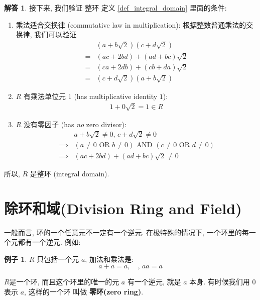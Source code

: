 \documentclass[utf8]{ctexbook}
\theoremstyle{definition}
\newtheorem{example}{例子}[section]
\newtheorem*{soln}{解答}
\begin{document}
\begin{soln}
接下来, 我们验证 整环 定义 \ref{def_integral_domain} 里面的条件:
\begin{enumerate}
\item{乘法适合交换律 (commutative law in multiplication): 根据整数普通乘法的交换律, 我们可以验证
\begin{align*}
& (a + b \sqrt{2}) (c + d \sqrt{2}) \\
=& (ac + 2bd) + (ad + bc) \sqrt{2} \\
=& (ca + 2db) + (cb + da) \sqrt{2} \\
=& (c + d \sqrt{2}) (a + b \sqrt{2})
\end{align*}
}
\item{$R$ 有乘法单位元 $1$ (has multiplicative identity $1$):
\begin{align*}
1 + 0 \sqrt{2} = 1 \in R
\end{align*}
}
\item{$R$ 没有零因子 (has \emph{no} zero divisor):
\begin{align*}
& a + b \sqrt{2} \neq 0, \,  c + d \sqrt{2} \neq 0 \\
\implies & (a \neq 0 \mbox{ OR } b \neq 0) \mbox{ AND } (c \neq 0 \mbox{ OR } d \neq 0) \\
\implies & (ac + 2bd) + (ad + bc) \sqrt{2} \neq 0 
\end{align*}
}
\end{enumerate}

所以, $R$ 是整环 (integral domain).

\end{soln}





\section{除环和域(Division Ring and Field)}

一般而言, 环的一个任意元不一定有一个逆元. 在极特殊的情况下, 一个环里的每一个元都有一个逆元. 例如:

\begin{example}
$R$ 只包括一个元 $a$, 加法和乘法是:
\begin{equation}
a + a = a, \quad, \, a a = a
\end{equation}

$R$是一个环, 而且这个环里的唯一的元 $a$ 有一个逆元, 就是 $a$ 本身. 有时候我们用 $0$ 表示 $a$, 这样的一个环 叫做 \textbf{零环(zero ring)}.

\end{example}
\end{document}

